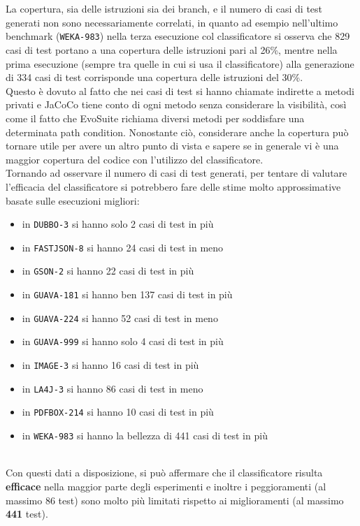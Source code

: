 \documentclass[a4paper, 12pt, oneside]{book}
\theoremstyle{normal}
\begin{document}
\\ \\ La copertura, sia delle istruzioni sia dei branch, e il numero di casi di test generati non sono necessariamente correlati, in quanto ad esempio nell'ultimo benchmark (\verb|WEKA-983|) nella terza esecuzione col classificatore si osserva che 829 casi di test portano a una copertura delle istruzioni pari al 26\%, mentre nella prima esecuzione (sempre tra quelle in cui si usa il classificatore) alla generazione di 334 casi di test corrisponde una copertura delle istruzioni del 30\%. \\ Questo è dovuto al fatto che nei casi di test si hanno chiamate indirette a metodi privati e JaCoCo tiene conto di ogni metodo senza considerare la visibilità, così come il fatto che EvoSuite richiama diversi metodi per soddisfare una determinata path condition. Nonostante ciò, considerare anche la copertura può tornare utile per avere un altro punto di vista e sapere se in generale vi è una maggior copertura del codice con l'utilizzo del classificatore. \\ Tornando ad osservare il numero di casi di test generati, per tentare di valutare l'efficacia del classificatore si potrebbero fare delle stime molto approssimative basate sulle esecuzioni migliori:
\begin{itemize}[label=$\bullet$, itemsep=0pt, topsep=2pt]
    \item in \verb|DUBBO-3| si hanno solo 2 casi di test in più
    \item in \verb|FASTJSON-8| si hanno 24 casi di test in meno
    \item in \verb|GSON-2| si hanno 22 casi di test in più
    \item in \verb|GUAVA-181| si hanno ben 137 casi di test in più
    \item in \verb|GUAVA-224| si hanno 52 casi di test in meno
    \item in \verb|GUAVA-999| si hanno solo 4 casi di test in più
    \item in \verb|IMAGE-3| si hanno 16 casi di test in più
    \item in \verb|LA4J-3| si hanno 86 casi di test in meno
    \item in \verb|PDFBOX-214| si hanno 10 casi di test in più
    \item in \verb|WEKA-983| si hanno la bellezza di 441 casi di test in più
\end{itemize}
\noindent \\ Con questi dati a disposizione, si può affermare che il classificatore risulta \textbf{efficace} nella maggior parte degli esperimenti e inoltre i peggioramenti (al massimo 86 test) sono molto più limitati rispetto ai miglioramenti (al massimo \textbf{441} test).
\end{document}
